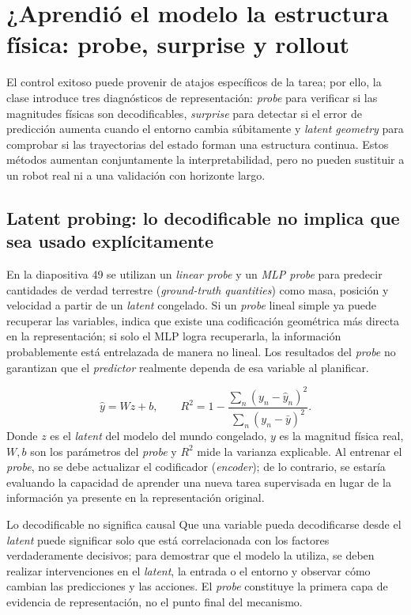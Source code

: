 \section{¿Aprendió el modelo la estructura física: probe, surprise y rollout}

El control exitoso puede provenir de atajos específicos de la tarea; por ello, la clase introduce tres diagnósticos de representación: \textit{probe} para verificar si las magnitudes físicas son decodificables, \textit{surprise} para detectar si el error de predicción aumenta cuando el entorno cambia súbitamente y \textit{latent geometry} para comprobar si las trayectorias del estado forman una estructura continua. Estos métodos aumentan conjuntamente la interpretabilidad, pero no pueden sustituir a un robot real ni a una validación con horizonte largo.

\subsection{Latent probing: lo decodificable no implica que sea usado explícitamente}

En la diapositiva 49 se utilizan un \textit{linear probe} y un \textit{MLP probe} para predecir cantidades de verdad terrestre (\textit{ground-truth quantities}) como masa, posición y velocidad a partir de un \textit{latent} congelado. Si un \textit{probe} lineal simple ya puede recuperar las variables, indica que existe una codificación geométrica más directa en la representación; si solo el MLP logra recuperarla, la información probablemente está entrelazada de manera no lineal. Los resultados del \textit{probe} no garantizan que el \textit{predictor} realmente dependa de esa variable al planificar.


\[
\hat y=Wz+b,
\qquad
R^2=1-\frac{\sum_n(y_n-\hat y_n)^2}{\sum_n(y_n-\bar y)^2}.
\]
Donde $z$ es el \textit{latent} del modelo del mundo congelado, $y$ es la magnitud física real, $W,b$ son los parámetros del \textit{probe} y $R^2$ mide la varianza explicable. Al entrenar el \textit{probe}, no se debe actualizar el codificador (\textit{encoder}); de lo contrario, se estaría evaluando la capacidad de aprender una nueva tarea supervisada en lugar de la información ya presente en la representación original.

\begin{warningbox}{Lo decodificable no significa causal}
Que una variable pueda decodificarse desde el \textit{latent} puede significar solo que está correlacionada con los factores verdaderamente decisivos; para demostrar que el modelo la utiliza, se deben realizar intervenciones en el \textit{latent}, la entrada o el entorno y observar cómo cambian las predicciones y las acciones. El \textit{probe} constituye la primera capa de evidencia de representación, no el punto final del mecanismo.
\end{warningbox}

